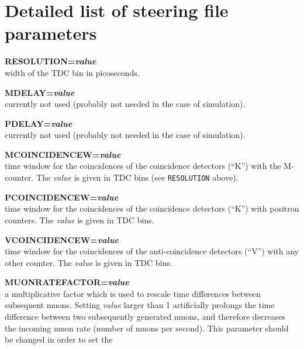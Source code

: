 \documentclass[twoside]{dis04}
\begin{document}
\section{Detailed list of steering file parameters}
\label{description}
\begin{description}
   \item{\bf RESOLUTION=\emph{value}} \\ 
         width of the TDC bin in picoseconds.
   \item{\bf MDELAY=\emph{value}} \\ 
         currently not used (probably not needed in the case of simulation).
   \item{\bf PDELAY=\emph{value}} \\ 
         currently not used (probably not needed in the case of simulation).
   \item{\bf MCOINCIDENCEW=\emph{value}} \\ 
         time window for the coincidences of the coincidence detectors (``K'')
         with the M-counter. The \emph{value} is given in TDC bins (see {\tt RESOLUTION} above).
   \item{\bf PCOINCIDENCEW=\emph{value}} \\ 
         time window for the coincidences of the coincidence detectors (``K'')
         with positron counters. The \emph{value} is given in TDC bins.
   \item{\bf VCOINCIDENCEW=\emph{value}} \\ 
         time window for the coincidences of the anti-coincidence detectors (``V'')
         with any other counter. The \emph{value} is given in TDC bins.
   \item{\bf MUONRATEFACTOR=\emph{value}} \\ 
         a multiplicative factor which is used to rescale time differences between subsequent muons.
	 Setting \emph{value} larger than 1 artificially prolongs the time difference between
	 two subsequently generated muons, and therefore decreases the incoming muon rate 
         (number of muons per second).  This parameter should be changed in order to set the

\end{description}
\end{document}
